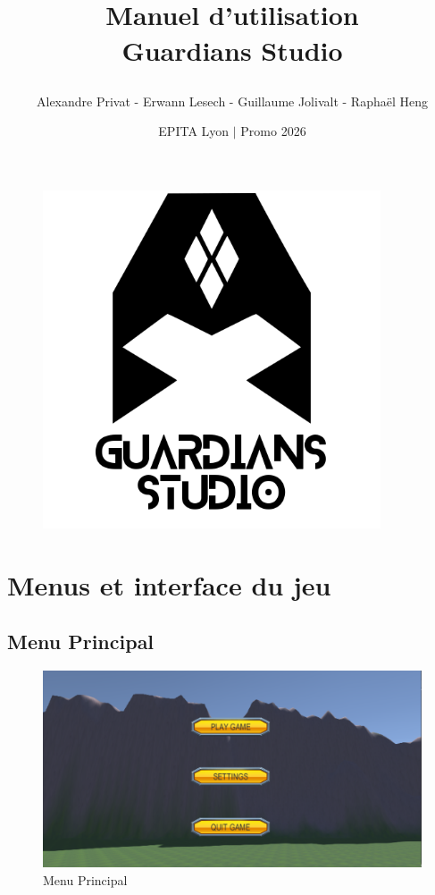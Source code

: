 \documentclass[a4paper]{article}
\title{
	\hrulefill 
	\\
	Manuel d'utilisation 
	\\
	\textbf{Guardians Studio}
	
	\hrulefill
}
\date{EPITA Lyon $|$ Promo 2026}
\author{Alexandre Privat - Erwann Lesech - Guillaume Jolivalt - Raphaël Heng}
\begin{document}
	\maketitle
	
	\begin{figure}[ht]
		\centering
		\includegraphics[width=10cm, height=10cm]{images/logo.png}
	\end{figure}
	
	\clearpage
	\tableofcontents
	\clearpage
	
	\section{Menus et interface du jeu}
	\subsection{Menu Principal}
	
	\begin{figure}[!ht]
		\centering
		\includegraphics[scale=0.3]{images/menu_principal.png}
		\caption{Menu Principal}
	\end{figure}
\end{document}
